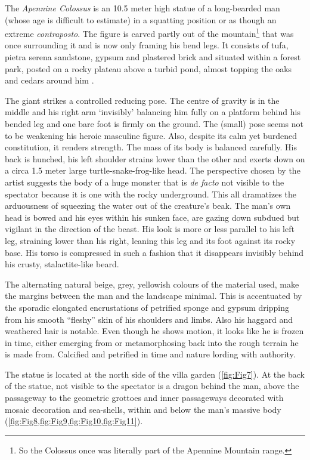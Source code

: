 The \textit{Apennine Colossus} is an 10.5 meter high statue of a long-bearded man (whose age is difficult to estimate) in a squatting position or as though an extreme \textit{contraposto}. The figure is carved partly out of the mountain\footnote{So the Colossus once was literally part of the Apennine Mountain range.}  that was once surrounding it and is now only framing his bend legs. It consists of tufa, pietra serena sandstone, gypsum and plastered brick and situated within a forest park, posted on a rocky plateau above a turbid pond, almost topping the oaks and cedars around him \parencites[227]{Dhanens1956}[3]{Walsh2015}[2]{DElia2011}.

The giant strikes a controlled reducing pose. The centre of gravity is in the middle and his right arm ‘invisibly’ balancing him fully on a platform behind his bended leg and one bare foot is firmly on the ground. The (small) pose seems not to be weakening his heroic masculine figure. Also, despite its calm yet burdened constitution, it renders strength. The mass of its body is balanced carefully.
His back is hunched, his left shoulder strains lower than the other and exerts down on a circa 1.5 meter large turtle-snake-frog-like head. The perspective chosen by the artist suggests the body of a huge monster that is \textit{de facto} not visible to the spectator because it is one with the rocky underground. This all dramatizes the arduousness of squeezing the water out of the creature’s beak. The man’s own head is bowed and his eyes within his sunken face, are gazing down subdued but vigilant in the direction of the beast. His look is more or less parallel to his left leg, straining lower than his right, leaning this leg and its foot against its rocky base. His torso is compressed in such a fashion that it disappears invisibly behind his crusty, stalactite-like beard.

The alternating natural beige, grey, yellowish colours of the material used, make the margins between the man and the landscape minimal. This is accentuated by the sporadic elongated encrustations of petrified sponge and gypsum dripping from his smooth “fleshy” skin of his shoulders and limbs. Also his haggard and weathered hair is notable.
Even though he shows motion, it looks like he is frozen in time, either emerging from or metamorphosing back into the rough terrain he is made from. Calcified and petrified in time and nature lording with authority.

The statue is located at the north side of the villa garden (\cref{fig:Fig7}). At the back of the statue, not visible to the spectator is a dragon behind the man, above the passageway to the geometric grottoes and inner passageways decorated with mosaic decoration and sea-shells, within and below the man’s massive body (\cref{fig:Fig8,fig:Fig9,fig:Fig10,fig:Fig11}).

